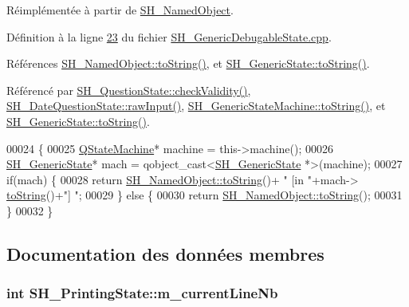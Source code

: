 Réimplémentée à partir de \hyperlink{classSH__NamedObject_a9f4b19df6a96a17daaf1060b3019ef47}{S\-H\-\_\-\-Named\-Object}.



Définition à la ligne \hyperlink{SH__GenericDebugableState_8cpp_source_l00023}{23} du fichier \hyperlink{SH__GenericDebugableState_8cpp_source}{S\-H\-\_\-\-Generic\-Debugable\-State.\-cpp}.



Références \hyperlink{classSH__NamedObject_a9f4b19df6a96a17daaf1060b3019ef47}{S\-H\-\_\-\-Named\-Object\-::to\-String()}, et \hyperlink{classSH__GenericState_a7779babbb40f3f8faa71112204d9804f}{S\-H\-\_\-\-Generic\-State\-::to\-String()}.



Référencé par \hyperlink{classSH__QuestionState_a902be003650c33d954d707b2d3ee0bb9}{S\-H\-\_\-\-Question\-State\-::check\-Validity()}, \hyperlink{classSH__DateQuestionState_a71917e94cb9ce692f916a848bc8c8892}{S\-H\-\_\-\-Date\-Question\-State\-::raw\-Input()}, \hyperlink{classSH__GenericStateMachine_a85c0c1c9d258ae991f84667412fa47cd}{S\-H\-\_\-\-Generic\-State\-Machine\-::to\-String()}, et \hyperlink{classSH__GenericState_a7779babbb40f3f8faa71112204d9804f}{S\-H\-\_\-\-Generic\-State\-::to\-String()}.


\begin{DoxyCode}
00024 \{
00025     \hyperlink{classQStateMachine}{QStateMachine}* machine = this->machine();
00026     \hyperlink{classSH__GenericState}{SH\_GenericState}* mach = qobject\_cast<\hyperlink{classSH__GenericState}{SH\_GenericState} *>(machine);
00027     \textcolor{keywordflow}{if}(mach) \{
00028         \textcolor{keywordflow}{return} \hyperlink{classSH__NamedObject_a9f4b19df6a96a17daaf1060b3019ef47}{SH\_NamedObject::toString}()+ \textcolor{stringliteral}{" [in "}+mach->
      \hyperlink{classSH__GenericState_a7779babbb40f3f8faa71112204d9804f}{toString}()+\textcolor{stringliteral}{"] "};
00029     \} \textcolor{keywordflow}{else} \{
00030         \textcolor{keywordflow}{return} \hyperlink{classSH__NamedObject_a9f4b19df6a96a17daaf1060b3019ef47}{SH\_NamedObject::toString}();
00031     \}
00032 \}
\end{DoxyCode}


\subsection{Documentation des données membres}
\hypertarget{classSH__PrintingState_ac458fdbc8cea191ab7b6da82761e50e0}{
\subsubsection[{m\-\_\-current\-Line\-Nb}]{\setlength{\rightskip}{0pt plus 5cm}int S\-H\-\_\-\-Printing\-State\-::m\-\_\-current\-Line\-Nb\hspace{0.3cm}{\ttfamily [private]}}}\label{classSH__PrintingState_ac458fdbc8cea191ab7b6da82761e50e0}



